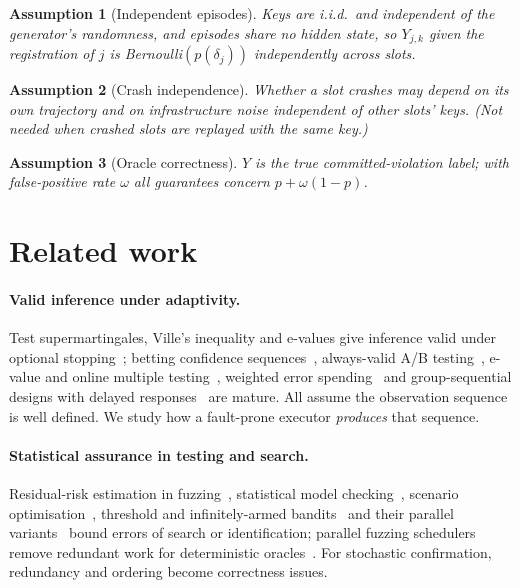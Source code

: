 \documentclass[pdflatex,sn-mathphys-num]{sn-jnl}
\theoremstyle{thmstyleone}
\theoremstyle{thmstyletwo}
\newtheorem{assumption}{Assumption}
\theoremstyle{thmstylethree}
\begin{document}
\begin{assumption}[Independent episodes]\label{as:a1} Keys are i.i.d.\ and independent of the generator's randomness, and episodes share no hidden state, so $Y_{j,k}$ given the registration of $j$ is Bernoulli$(p(\delta_j))$ independently across slots.\end{assumption}
\begin{assumption}[Crash independence]\label{as:a2} Whether a slot crashes may depend on its own trajectory and on infrastructure noise independent of other slots' keys. (Not needed when crashed slots are replayed with the same key.)\end{assumption}
\begin{assumption}[Oracle correctness]\label{as:a3} $Y$ is the true committed-violation label; with false-positive rate $\omega$ all guarantees concern $p+\omega(1-p)$.\end{assumption}

\section{Related work}\label{sec:related}

\paragraph{Valid inference under adaptivity.} Test supermartingales, Ville's inequality and e-values give inference valid under optional stopping~\cite{ramdas2023savi,vovk2021,grunwald2024safe}; betting confidence sequences~\cite{waudbysmith2024,howard2021}, always-valid A/B testing~\cite{johari2022}, e-value and online multiple testing~\cite{wang2022ebh,xu2024online,foster2008}, weighted error spending~\cite{genovese2006} and group-sequential designs with delayed responses~\cite{hampson2013} are mature. All assume the observation sequence is well defined. We study how a fault-prone executor \emph{produces} that sequence.

\paragraph{Statistical assurance in testing and search.} Residual-risk estimation in fuzzing~\cite{bohme2018stads,bohme2021residual}, statistical model checking~\cite{younes2006,legay2010}, scenario optimisation~\cite{campi2008}, threshold and infinitely-armed bandits~\cite{kano2019,locatelli2016,aziz2018,chaudhuri2017} and their parallel variants~\cite{hillel2013,li2020asha} bound errors of search or identification; parallel fuzzing schedulers remove redundant work for deterministic oracles~\cite{dynamiq2025}. For stochastic confirmation, redundancy and ordering become correctness issues.
\end{document}
